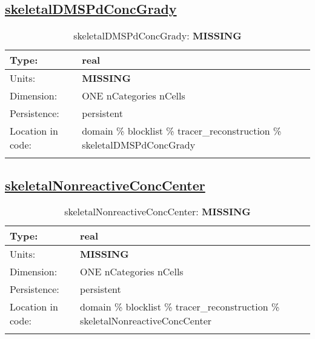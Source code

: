 \subsection[skeletalDMSPdConcGrady]{\hyperref[sec:var_tab_tracer_reconstruction]{skeletalDMSPdConcGrady}}
\label{subsec:var_sec_tracer_reconstruction_skeletalDMSPdConcGrady}
\begin{center}
\begin{longtable}{| p{2.0in} | p{4.0in} |}
        \hline 
        Type: & real \\
        \hline 
        Units: & {\bf \color{red} MISSING} \\
        \hline 
        Dimension: & ONE nCategories nCells \\
        \hline 
        Persistence: & persistent \\
        \hline 
         Location in code: & domain \% blocklist \% tracer\_reconstruction \% skeletalDMSPdConcGrady \\
         \hline 
    \caption{skeletalDMSPdConcGrady: {\bf \color{red} MISSING}}
\end{longtable}
\end{center}
\subsection[skeletalNonreactiveConcCenter]{\hyperref[sec:var_tab_tracer_reconstruction]{skeletalNonreactiveConcCenter}}
\label{subsec:var_sec_tracer_reconstruction_skeletalNonreactiveConcCenter}
\begin{center}
\begin{longtable}{| p{2.0in} | p{4.0in} |}
        \hline 
        Type: & real \\
        \hline 
        Units: & {\bf \color{red} MISSING} \\
        \hline 
        Dimension: & ONE nCategories nCells \\
        \hline 
        Persistence: & persistent \\
        \hline 
         Location in code: & domain \% blocklist \% tracer\_reconstruction \% skeletalNonreactiveConcCenter \\
         \hline 
    \caption{skeletalNonreactiveConcCenter: {\bf \color{red} MISSING}}
\end{longtable}
\end{center}
